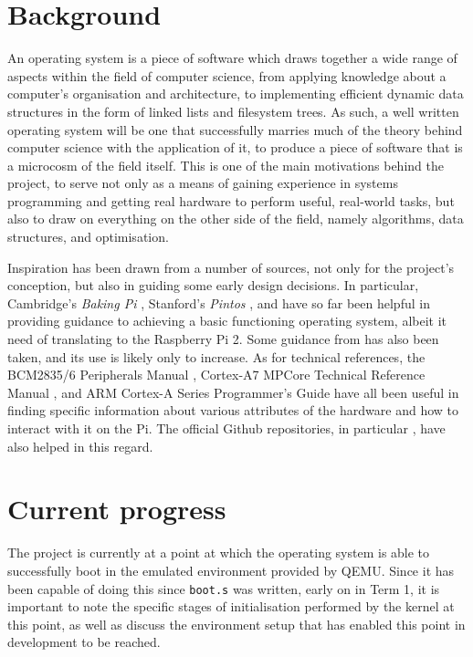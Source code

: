 \documentclass[10pt,a4paper]{article}
\newcommand{\code}[1]{\texttt{#1}}
\begin{document}
\section{Background}
An operating system is a piece of software which draws together a wide range of
aspects within the field of computer science, from applying knowledge about a
computer's organisation and architecture, to implementing efficient dynamic data
structures in the form of linked lists and filesystem trees. As such, a well
written operating system will be one that successfully marries much of the
theory behind computer science with the application of it, to produce a piece of
software that is a microcosm of the field itself. This is one of the main
motivations behind the project, to serve not only as a means of gaining
experience in systems programming and getting real hardware to perform useful,
real-world tasks, but also to draw on everything on the other side of the field,
namely algorithms, data structures, and optimisation.

Inspiration has been drawn from a number of sources, not only for the project's
conception, but also in guiding some early design decisions. In particular,
Cambridge's \textit{Baking Pi} \cite{BakingPi}, Stanford's \textit{Pintos}
\cite{Pintos}, and \cite{jsandler} have so far been helpful in providing
guidance to achieving a basic functioning operating system, albeit it need of
translating to the Raspberry Pi 2. Some guidance from \cite{littleosbook} has
also been taken, and its use is likely only to increase. As for technical
references, the BCM2835/6 Peripherals Manual \cite{BCM2835, BCM2836}, Cortex-A7
MPCore Technical Reference Manual \cite{TRM}, and ARM Cortex-A Series
Programmer's Guide \cite{PG} have all been useful in finding specific
information about various attributes of the hardware and how to interact with it
on the Pi. The official Github repositories, in particular
\cite{PiDocumentation}, have also helped in this regard.

\section{Current progress}
The project is currently at a point at which the operating system is able to
successfully boot in the emulated environment provided by QEMU. Since it has
been capable of doing this since \code{boot.s} was written, early on in Term 1,
it is important to note the specific stages of initialisation performed by the
kernel at this point, as well as discuss the environment setup that has enabled
this point in development to be reached.
\end{document}
